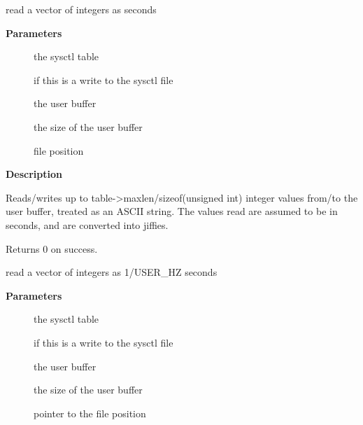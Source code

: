 \documentclass[a4paper,8pt,english]{sphinxmanual}
\begin{document}
\begin{fulllineitems}
\label{filesystems/index:c.proc_dointvec_jiffies}
read a vector of integers as seconds

\end{fulllineitems}


\textbf{Parameters}
\begin{description}
\item[{}] \leavevmode
the sysctl table

\item[{}] \leavevmode
{} if this is a write to the sysctl file

\item[{}] \leavevmode
the user buffer

\item[{}] \leavevmode
the size of the user buffer

\item[{}] \leavevmode
file position

\end{description}

\textbf{Description}

Reads/writes up to table-\textgreater{}maxlen/sizeof(unsigned int) integer
values from/to the user buffer, treated as an ASCII string.
The values read are assumed to be in seconds, and are converted into
jiffies.

Returns 0 on success.

\begin{fulllineitems}
\label{filesystems/index:c.proc_dointvec_userhz_jiffies}
read a vector of integers as 1/USER\_HZ seconds

\end{fulllineitems}


\textbf{Parameters}
\begin{description}
\item[{}] \leavevmode
the sysctl table

\item[{}] \leavevmode
{} if this is a write to the sysctl file

\item[{}] \leavevmode
the user buffer

\item[{}] \leavevmode
the size of the user buffer

\item[{}] \leavevmode
pointer to the file position

\end{description}
\end{document}
